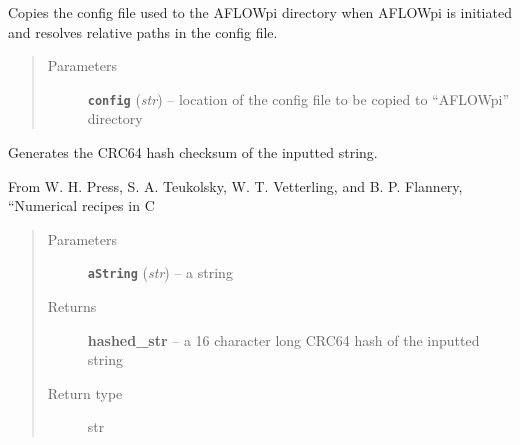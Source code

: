 \documentclass[letterpaper,10pt,english]{sphinxmanual}
\begin{document}
\begin{fulllineitems}
\label{prep:prep.__copyConfig}
Copies the config file used to the AFLOWpi directory when AFLOWpi
is initiated and resolves relative paths in the config file.
\begin{quote}\begin{description}
\item[{Parameters}] \leavevmode
\textbf{\texttt{config}} (\emph{str}) -- location of the config file to be copied to ``AFLOWpi'' directory

\end{description}\end{quote}

\end{fulllineitems}


\begin{fulllineitems}
\label{prep:prep.__crc64digest}
Generates the CRC64 hash checksum of the inputted string.

From W. H. Press, S. A. Teukolsky, W. T. Vetterling, and
B. P. Flannery, ``Numerical recipes in C
\begin{quote}\begin{description}
\item[{Parameters}] \leavevmode
\textbf{\texttt{aString}} (\emph{str}) -- a string

\item[{Returns}] \leavevmode
\textbf{hashed\_str} --
a 16 character long CRC64 hash of the inputted string

\item[{Return type}] \leavevmode
str

\end{description}\end{quote}

\end{fulllineitems}

\end{document}
